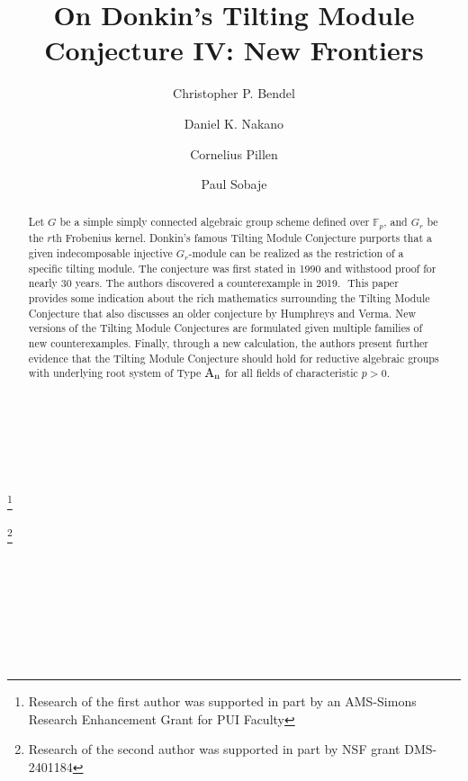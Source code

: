\documentclass[twoside,11pt,reqno]{amsart}
\newcommand{\0}{\bar 0}
\newcommand{\1}{\bar 1}
\theoremstyle{definition}
\numberwithin{equation}{subsection}
\begin{document}
﻿
\title{On Donkin's Tilting Module Conjecture IV: New Frontiers}
﻿
﻿
\author{\sc Christopher P. Bendel}
\address
{Department of Mathematics, Statistics and Computer Science\\
University of
Wisconsin-Stout Polytechnic\\
Menomonie\\ WI~54751, USA}
\thanks{Research of the first author was supported in part by an AMS-Simons Research Enhancement Grant for PUI Faculty}
﻿
﻿
﻿
\author{\sc Daniel K. Nakano}
\address
{Department of Mathematics\\ University of Georgia \\
Athens\\ GA~30602, USA}
\thanks{Research of the second author was supported in part by
NSF grant DMS-2401184}
﻿
﻿
﻿
\author{\sc Cornelius Pillen}
\address{Department of Mathematics and Statistics \\ University
of South
Alabama\\
Mobile\\ AL~36688, USA}
﻿
\author{Paul Sobaje}
\address{Department of Mathematical Sciences \\
          Georgia Southern University\\
          Statesboro, GA~30458, USA}
﻿
\begin{abstract}
Let $G$ be a simple simply connected algebraic group scheme defined over ${\mathbb F}_{p}$, and $G_{r}$ be the $r$th Frobenius kernel. 
Donkin's famous Tilting Module Conjecture purports that a given indecomposable injective $G_{r}$-module can be realized as the restriction of a specific  
tilting module. The conjecture was first stated in 1990 and withstood proof for nearly 30 years. The authors discovered a counterexample in 2019. 
﻿
This paper provides some indication about the rich mathematics surrounding the Tilting Module Conjecture that also discusses an older conjecture by 
Humphreys and Verma. New versions of the Tilting Module Conjectures are formulated given multiple families of new counterexamples. Finally, through a new calculation, 
the authors present further evidence that the Tilting Module Conjecture should hold for reductive algebraic groups with underlying root system of Type $\rm{A}_{n}$ for all fields of characteristic $p>0$.  
\end{abstract}
﻿
﻿
﻿
﻿
\maketitle
﻿
\end{document}
